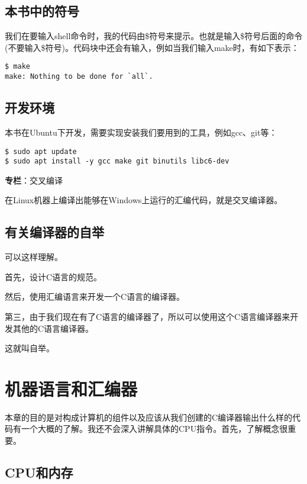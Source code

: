 \documentclass[cn,10pt,math=newtx,citestyle=gb7714-2015,bibstyle=gb7714-2015]{elegantbook}
\begin{document}
\subsection{本书中的符号}
    我们在要输入shell命令时，我的代码由\$符号来提示。也就是输入\$符号后面的命令(不要输入\$符号)。代码块中还会有输入，例如当我们输入make时，有如下表示：

\begin{verbatim}
$ make
make: Nothing to be done for `all`.
\end{verbatim}

\subsection{开发环境}

本书在Ubuntu下开发，需要实现安装我们要用到的工具，例如gcc、git等：

\begin{verbatim}
$ sudo apt update
$ sudo apt install -y gcc make git binutils libc6-dev
\end{verbatim}

\begin{tcolorbox}
\textbf{专栏}：交叉编译

在Linux机器上编译出能够在Windows上运行的汇编代码，就是交叉编译器。
\end{tcolorbox}

\subsection{有关编译器的自举}

可以这样理解。

首先，设计C语言的规范。

然后，使用汇编语言来开发一个C语言的编译器。

第三，由于我们现在有了C语言的编译器了，所以可以使用这个C语言编译器来开发其他的C语言编译器。

这就叫自举。

\section{机器语言和汇编器}

本章的目的是对构成计算机的组件以及应该从我们创建的C编译器输出什么样的代码有一个大概的了解。我还不会深入讲解具体的CPU指令。首先，了解概念很重要。

\subsection{CPU和内存}
\end{document}
